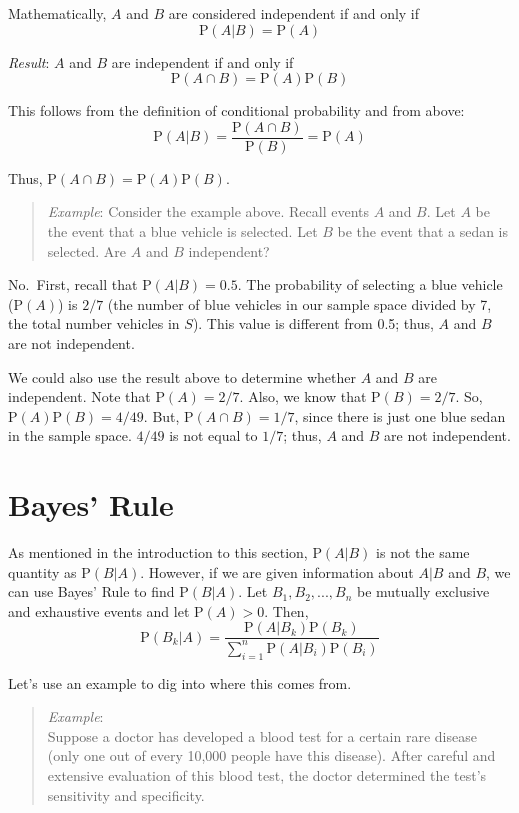 \documentclass[
  letterpaper,
  DIV=11,
  numbers=noendperiod]{scrreprt}
\begin{document}
Mathematically, \(A\) and \(B\) are considered independent if and only
if \[
\mbox{P}(A|B)=\mbox{P}(A)
\]

\emph{Result}: \(A\) and \(B\) are independent if and only if \[
\mbox{P}(A\cap B)=\mbox{P}(A)\mbox{P}(B)
\]

This follows from the definition of conditional probability and from
above: \[
\mbox{P}(A|B)=\frac{\mbox{P}(A\cap B)}{\mbox{P}(B)}=\mbox{P}(A)
\]

Thus, \(\mbox{P}(A\cap B)=\mbox{P}(A)\mbox{P}(B)\).

\begin{quote}
\emph{Example}: Consider the example above. Recall events \(A\) and
\(B\). Let \(A\) be the event that a blue vehicle is selected. Let \(B\)
be the event that a sedan is selected. Are \(A\) and \(B\) independent?
\end{quote}

No.~First, recall that \(\mbox{P}(A|B)=0.5\). The probability of
selecting a blue vehicle (\(\mbox{P}(A)\)) is \(2/7\) (the number of
blue vehicles in our sample space divided by 7, the total number
vehicles in \(S\)). This value is different from 0.5; thus, \(A\) and
\(B\) are not independent.

We could also use the result above to determine whether \(A\) and \(B\)
are independent. Note that \(\mbox{P}(A)= 2/7\). Also, we know that
\(\mbox{P}(B)=2/7\). So, \(\mbox{P}(A)\mbox{P}(B)=4/49\). But,
\(\mbox{P}(A\cap B) = 1/7\), since there is just one blue sedan in the
sample space. \(4/49\) is not equal to \(1/7\); thus, \(A\) and \(B\)
are not independent.

\section{Bayes' Rule}\label{bayes-rule}

As mentioned in the introduction to this section, \(\mbox{P}(A|B)\) is
not the same quantity as \(\mbox{P}(B|A)\). However, if we are given
information about \(A|B\) and \(B\), we can use Bayes' Rule to find
\(\mbox{P}(B|A)\). Let \(B_1, B_2, ..., B_n\) be mutually exclusive and
exhaustive events and let \(\mbox{P}(A)>0\). Then, \[
\mbox{P}(B_k|A)=\frac{\mbox{P}(A|B_k)\mbox{P}(B_k)}{\sum_{i=1}^n \mbox{P}(A|B_i)\mbox{P}(B_i)}
\]

Let's use an example to dig into where this comes from.

\begin{quote}
\emph{Example}:\\
Suppose a doctor has developed a blood test for a certain rare disease
(only one out of every 10,000 people have this disease). After careful
and extensive evaluation of this blood test, the doctor determined the
test's sensitivity and specificity.
\end{quote}
\end{document}
